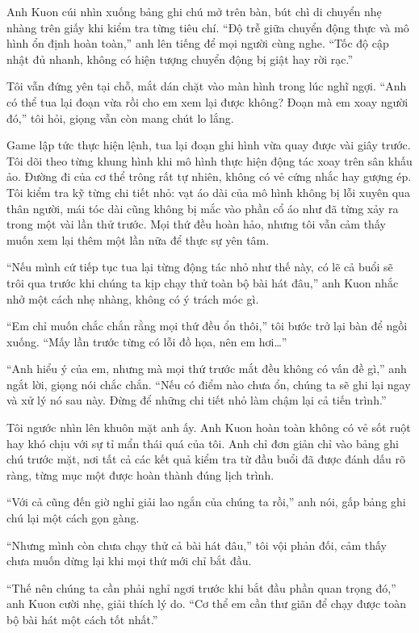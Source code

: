 ﻿\documentclass[../main.tex]{subfiles}
\begin{document}
Anh Kuon cúi nhìn xuống bảng ghi chú mở trên bàn, bút chì di chuyển nhẹ nhàng trên giấy khi kiểm tra từng tiêu chí. ``Độ trễ giữa chuyển động thực và mô hình ổn định hoàn toàn,'' anh lên tiếng để mọi người cùng nghe. ``Tốc độ cập nhật đủ nhanh, không có hiện tượng chuyển động bị giật hay rời rạc.''

Tôi vẫn đứng yên tại chỗ, mắt dán chặt vào màn hình trong lúc nghĩ ngợi. ``Anh có thể tua lại đoạn vừa rồi cho em xem lại được không? Đoạn mà em xoay người đó,'' tôi hỏi, giọng vẫn còn mang chút lo lắng.

Game lập tức thực hiện lệnh, tua lại đoạn ghi hình vừa quay được vài giây trước. Tôi dõi theo từng khung hình khi mô hình thực hiện động tác xoay trên sân khấu ảo. Đường đi của cơ thể trông rất tự nhiên, không có vẻ cứng nhắc hay gượng ép. Tôi kiểm tra kỹ từng chi tiết nhỏ: vạt áo dài của mô hình không bị lỗi xuyên qua thân người, mái tóc dài cũng không bị mắc vào phần cổ áo như đã từng xảy ra trong một vài lần thử trước. Mọi thứ đều hoàn hảo, nhưng tôi vẫn cảm thấy muốn xem lại thêm một lần nữa để thực sự yên tâm.

``Nếu mình cứ tiếp tục tua lại từng động tác nhỏ như thế này, có lẽ cả buổi sẽ trôi qua trước khi chúng ta kịp chạy thử toàn bộ bài hát đâu,'' anh Kuon nhắc nhở một cách nhẹ nhàng, không có ý trách móc gì.

``Em chỉ muốn chắc chắn rằng mọi thứ đều ổn thôi,'' tôi bước trở lại bàn để ngồi xuống. ``Mấy lần trước từng có lỗi đồ họa, nên em hơi\dots''

``Anh hiểu ý của em, nhưng mà mọi thứ trước mắt đều không có vấn đề gì,'' anh ngắt lời, giọng nói chắc chắn. ``Nếu có điểm nào chưa ổn, chúng ta sẽ ghi lại ngay và xử lý nó sau này. Đừng để những chi tiết nhỏ làm chậm lại cả tiến trình.''

Tôi ngước nhìn lên khuôn mặt anh ấy. Anh Kuon hoàn toàn không có vẻ sốt ruột hay khó chịu với sự tỉ mẩn thái quá của tôi. Anh chỉ đơn giản chỉ vào bảng ghi chú trước mặt, nơi tất cả các kết quả kiểm tra từ đầu buổi đã được đánh dấu rõ ràng, từng mục một được hoàn thành đúng lịch trình.

``Với cả cũng đến giờ nghỉ giải lao ngắn của chúng ta rồi,'' anh nói, gấp bảng ghi chú lại một cách gọn gàng.

``Nhưng mình còn chưa chạy thử cả bài hát đâu,'' tôi vội phản đối, cảm thấy chưa muốn dừng lại khi mọi thứ mới chỉ bắt đầu.

``Thế nên chúng ta cần phải nghỉ ngơi trước khi bắt đầu phần quan trọng đó,'' anh Kuon cười nhẹ, giải thích lý do. ``Cơ thể em cần thư giãn để chạy được toàn bộ bài hát một cách tốt nhất.''
\end{document}
